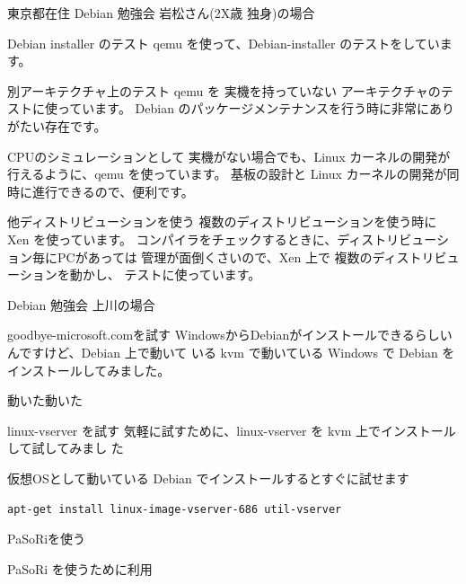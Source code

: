 \documentclass[cjk,dvipdfmx]{beamer}
\begin{document}
\begin{frame}{}
東京都在住 Debian 勉強会 岩松さん(2X歳 独身)の場合
\end{frame}

\begin{frame}
{Debian installer のテスト}
 qemu を使って、Debian-installer のテストをしています。
\end{frame}

\begin{frame}
{別アーキテクチャ上のテスト}
 qemu を 実機を持っていない アーキテクチャのテストに使っています。
 Debian のパッケージメンテナンスを行う時に非常にありがたい存在です。
\end{frame}

\begin{frame}
{CPUのシミュレーションとして}
 実機がない場合でも、Linux カーネルの開発が行えるように、qemu を使っています。
 基板の設計と Linux カーネルの開発が同時に進行できるので、便利です。
\end{frame}

\begin{frame}
{他ディストリビューションを使う}
 複数のディストリビューションを使う時に Xen を使っています。
 コンパイラをチェックするときに、ディストリビューション毎にPCがあっては
 管理が面倒くさいので、Xen 上で 複数のディストリビューションを動かし、
 テストに使っています。
\end{frame}



\begin{frame}{}
Debian 勉強会 上川の場合
\end{frame}

\begin{frame}{goodbye-microsoft.comを試す}
WindowsからDebianがインストールできるらしいんですけど、Debian 上で動いて
 いる kvm で動いている Windows で Debian をインストールしてみました。

動いた動いた
\end{frame}

\begin{frame}{linux-vserver を試す}
気軽に試すために、linux-vserver を kvm 上でインストールして試してみまし
 た

仮想OSとして動いている Debian でインストールするとすぐに試せます

\texttt{apt-get install linux-image-vserver-686 util-vserver}

\end{frame}


\begin{frame}{PaSoRiを使う}

PaSoRi を使うために利用

\end{frame}
\end{document}
